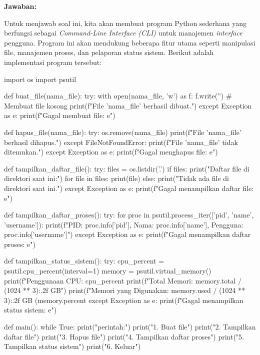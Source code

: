 \documentclass[12pt]{article}
\begin{document}
\textbf{Jawaban:}
\par Untuk menjawab soal ini, kita akan membuat program Python sederhana yang berfungsi sebagai \textit{Command-Line Interface (CLI)} untuk manajemen \textit{interface} pengguna. Program ini akan mendukung beberapa fitur utama seperti manipulasi file, manajemen proses, dan pelaporan status sistem. Berikut adalah implementasi program tersebut:
\begin{python}
    import os
    import psutil
    
    def buat_file(nama_file):
        try:
            with open(nama_file, 'w') as f:
                f.write('')  # Membuat file kosong
            print(f"File '{nama_file}' berhasil dibuat.")
        except Exception as e:
            print(f"Gagal membuat file: {e}")
    
    def hapus_file(nama_file):
        try:
            os.remove(nama_file)
            print(f"File '{nama_file}' berhasil dihapus.")
        except FileNotFoundError:
            print(f"File '{nama_file}' tidak ditemukan.")
        except Exception as e:
            print(f"Gagal menghapus file: {e}")
    
    def tampilkan_daftar_file():
        try:
            files = os.listdir('.')
            if files:
                print("Daftar file di direktori saat ini:")
                for file in files:
                    print(file)
            else:
                print("Tidak ada file di direktori saat ini.")
        except Exception as e:
            print(f"Gagal menampilkan daftar file: {e}")
    
    def tampilkan_daftar_proses():
        try:
            for proc in psutil.process_iter(['pid', 'name', 'username']):
                print(f"PID: {proc.info['pid']}, Nama: {proc.info['name']}, Pengguna: {proc.info['username']}")
        except Exception as e:
            print(f"Gagal menampilkan daftar proses: {e}")
    
    def tampilkan_status_sistem():
        try:
            cpu_percent = psutil.cpu_percent(interval=1)
            memory = psutil.virtual_memory()
            print(f"Penggunaan CPU: {cpu_percent}%
            print(f"Total Memori: {memory.total / (1024 ** 3):.2f} GB")
            print(f"Memori yang Digunakan: {memory.used / (1024 ** 3):.2f} GB ({memory.percent}%
        except Exception as e:
            print(f"Gagal menampilkan status sistem: {e}")
    
    def main():
        while True:
            print("\nPilih perintah:")
            print("1. Buat file")
            print("2. Tampilkan daftar file")
            print("3. Hapus file")
            print("4. Tampilkan daftar proses")
            print("5. Tampilkan status sistem")
            print("6. Keluar")
            

\end{python}
\end{document}
